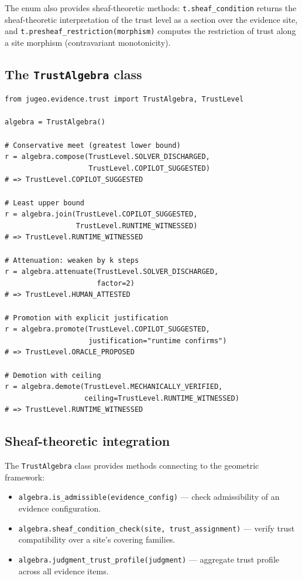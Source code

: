 \documentclass[11pt]{article}
\begin{document}
The enum also provides sheaf-theoretic methods:
\texttt{t.sheaf\_condition} returns the sheaf-theoretic
interpretation of the trust level as a section over the
evidence site, and
\texttt{t.presheaf\_restriction(morphism)} computes the
restriction of trust along a site morphism (contravariant
monotonicity).

\subsection{The \texttt{TrustAlgebra} class}

\begin{lstlisting}[caption={The TrustAlgebra class.},label=lst:trustalgebra]
from jugeo.evidence.trust import TrustAlgebra, TrustLevel

algebra = TrustAlgebra()

# Conservative meet (greatest lower bound)
r = algebra.compose(TrustLevel.SOLVER_DISCHARGED,
                    TrustLevel.COPILOT_SUGGESTED)
# => TrustLevel.COPILOT_SUGGESTED

# Least upper bound
r = algebra.join(TrustLevel.COPILOT_SUGGESTED,
                 TrustLevel.RUNTIME_WITNESSED)
# => TrustLevel.RUNTIME_WITNESSED

# Attenuation: weaken by k steps
r = algebra.attenuate(TrustLevel.SOLVER_DISCHARGED,
                      factor=2)
# => TrustLevel.HUMAN_ATTESTED

# Promotion with explicit justification
r = algebra.promote(TrustLevel.COPILOT_SUGGESTED,
                    justification="runtime confirms")
# => TrustLevel.ORACLE_PROPOSED

# Demotion with ceiling
r = algebra.demote(TrustLevel.MECHANICALLY_VERIFIED,
                   ceiling=TrustLevel.RUNTIME_WITNESSED)
# => TrustLevel.RUNTIME_WITNESSED
\end{lstlisting}

\subsection{Sheaf-theoretic integration}

The \texttt{TrustAlgebra} class provides methods connecting
to the geometric framework:

\begin{itemize}[nosep]
  \item \texttt{algebra.is\_admissible(evidence\_config)} ---
        check admissibility of an evidence configuration.
  \item \texttt{algebra.sheaf\_condition\_check(site, trust\_assignment)} ---
        verify trust compatibility over a site's covering families.
  \item \texttt{algebra.judgment\_trust\_profile(judgment)} ---
        aggregate trust profile across all evidence items.
\end{itemize}
\end{document}
